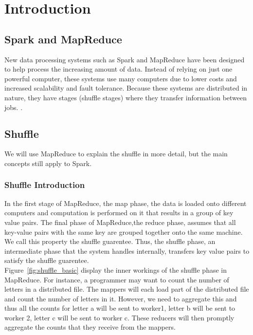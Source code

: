 \chapter{Introduction}\label{intro-ch}

\section{Spark and MapReduce}


New data processing systems such as Spark and MapReduce have been designed to help process the increasing amount of data. 
Instead of relying on just one powerful computer, these systems use many computers due to lower costs and increased scalability and fault tolerance. 
Because these systems are distributed in nature, they have stages (shuffle stages) where they transfer information between jobs. 
.
\section{Shuffle} 

We will use MapReduce to explain the shuffle in more detail, but the main concepts still apply to Spark.

\subsection{Shuffle Introduction}
In the first stage of MapReduce, the map phase, the data is loaded onto different computers and computation is performed on it that results 
in a group of key value pairs. The final phase of MapReduce,the reduce phase, assumes that all key-value pairs with the same
key are grouped together onto the same machine. We call this property the shuffle guarentee. Thus, the shuffle phase, an intermediate phase that the system handles internally, transfers key value pairs to satisfy the shuffle guarentee. 
\\

Figure~\ref{fig:shuffle_basic} display the inner workings 
of the shuffle phase in MapReduce. For instance, a programmer may  want to count the 
number of letters in a distributed file. The mappers will each load part of the distributed file and count the number of
letters in it. However, we need to aggregate this and 
thus all the counts for letter a will be sent to worker1, letter b will be sent to worker 2,
letter c will be sent to worker c. These reducers will then promptly aggregate the counts that they receive from the 
mappers.

